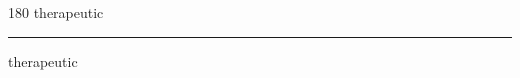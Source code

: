 
\begin{frame}
\begin{center}
\begin{turn}{180}
{\fontsize{2.5cm}{1em}\selectfont therapeutic}
\end{turn}
\vspace{1em}\par  
\hrule
\vspace{1em}\par  
{\fontsize{2.5cm}{1em}\selectfont therapeutic}
\end{center}
\end{frame}
